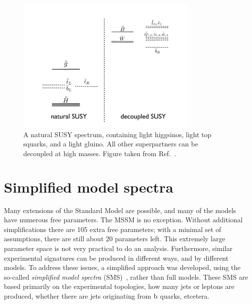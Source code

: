 \begin{figure}[t]
  \centering
  \includegraphics[width=0.8\textwidth]{figures/susy/NaturalSpec}
  \caption{ A natural SUSY spectrum, containing light higgsinos, light top squarks, and a light
gluino. All other superpartners can be decoupled at high masses. Figure taken from
Ref.~\cite{Papucci:2011wy}.
  \label{fig:natural_spectrum}}
\end{figure}



\section{Simplified model spectra \label{sec:susy_sms}}

Many extensions of the Standard Model are possible, and many of the models have numerous free
parameters. The MSSM is no exception. Without additional simplifications there are 105 extra free
parameters; with a minimal set of assumptions, there are still about 20 parameters left. This
extremely large parameter space is not very practical to do an analysis. 
Furthermore, similar experimental signatures can be produced in different ways, and by different
models.
To address these issues, a simplified approach was developed, using the so-called
\textit{simplified model spectra} (SMS)~\cite{Alves:2011wf,Alwall:2008ag,Chatrchyan:2013sza},
rather than full models. These SMS are based primarily on the experimental topologies, how many jets
or leptons are produced, whether there are jets originating from $\mathrm{b}$ quarks, etcetera. 

